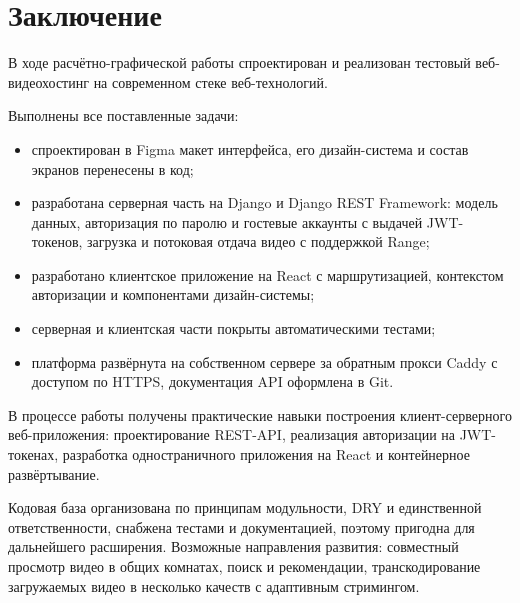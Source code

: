 \chapter*{Заключение}
\label{ch:conclusion}

В ходе расчётно-графической работы спроектирован и реализован тестовый
веб-видеохостинг на современном стеке веб-технологий.

Выполнены все поставленные задачи:
\begin{itemize}
  \item спроектирован в Figma макет интерфейса, его дизайн-система и
        состав экранов перенесены в код;
  \item разработана серверная часть на Django и Django REST Framework:
        модель данных, авторизация по паролю и гостевые аккаунты с
        выдачей JWT-токенов, загрузка и потоковая отдача видео с
        поддержкой Range;
  \item разработано клиентское приложение на React с маршрутизацией,
        контекстом авторизации и компонентами дизайн-системы;
  \item серверная и клиентская части покрыты автоматическими тестами;
  \item платформа развёрнута на собственном сервере за обратным прокси
        Caddy с доступом по HTTPS, документация API оформлена в Git.
\end{itemize}

В процессе работы получены практические навыки построения
клиент-серверного веб-приложения: проектирование REST-API, реализация
авторизации на JWT-токенах, разработка одностраничного приложения на
React и контейнерное развёртывание.

Кодовая база организована по принципам модульности, DRY и единственной
ответственности, снабжена тестами и документацией, поэтому пригодна для
дальнейшего расширения. Возможные направления развития: совместный
просмотр видео в общих комнатах, поиск и рекомендации, транскодирование
загружаемых видео в несколько качеств с адаптивным стримингом.

\endinput
